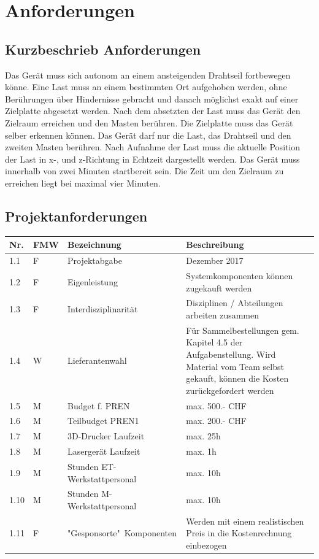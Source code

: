 \documentclass[a4paper]{report}
\begin{document}
\chapter{Anforderungen}
\section{Kurzbeschrieb Anforderungen}

Das Gerät muss sich autonom an einem ansteigenden Drahtseil fortbewegen könne. Eine Last muss an einem bestimmten Ort aufgehoben werden, ohne Berührungen über Hindernisse gebracht und danach möglichst exakt auf einer Zielplatte abgesetzt werden. Nach dem absetzten der Last muss das Gerät den Zielraum erreichen und den Masten berühren. Die Zielplatte muss das Gerät selber erkennen können. Das Gerät darf nur die Last, das Drahtseil und den zweiten Masten berühren. Nach Aufnahme der Last muss die aktuelle Position der Last in x-, und z-Richtung in Echtzeit dargestellt werden. Das Gerät muss innerhalb von zwei Minuten startbereit sein. Die Zeit um den Zielraum zu erreichen liegt bei maximal vier Minuten. 

\section{Projektanforderungen}
\begin{tabular}{|p{}|p{}|p{}|p{}|}
	\hline
	\textbf{Nr.} & \textbf{FMW\footnotemark} & \textbf{Bezeichnung} & \textbf{Beschreibung} \\
	\hline
	1.1 & F & Projektabgabe & Dezember 2017 \\
	\hline
	1.2 & F & Eigenleistung & Systemkomponenten können zugekauft werden \\
	\hline
	1.3 & F & Interdisziplinarität & Disziplinen / Abteilungen arbeiten zusammen \\
	\hline
	1.4 & W & Lieferantenwahl & Für Sammelbestellungen gem. Kapitel 4.5 der Aufgabenstellung. Wird Material vom Team selbst gekauft, können die Kosten zurückgefordert werden \\
	\hline
	1.5 & M & Budget f. PREN & max. 500.- CHF \\
	\hline
	1.6 & M & Teilbudget PREN1 & max. 200.- CHF \\
	\hline
	1.7 & M & 3D-Drucker Laufzeit & max. 25h \\
	\hline
	1.8 & M & Lasergerät Laufzeit & max. 1h \\
	\hline
	1.9 & M & Stunden ET-Werkstattpersonal & max. 10h \\
	\hline
	1.10 & M & Stunden M-Werkstattpersonal & max. 10h \\
	\hline
	1.11 & F & "Gesponsorte"\ Komponenten & Werden mit einem realistischen Preis in die Kostenrechnung einbezogen \\
	\hline
\end{tabular}
\end{document}
